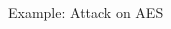 \documentclass[final]{beamer}
\begin{document}
\begin{frame}[fragile]{}
\begin{columns}[t]
\begin{column}{.31\linewidth}
\begin{block}{Example: Attack on AES}
       \end{block}
%          
%          
   \end{column}
\end{columns}

\end{frame}
\end{document}
